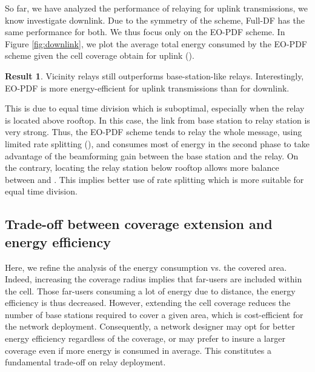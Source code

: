 \documentclass[journal]{IEEEtran}
\theoremstyle{definition}
\newtheorem{result}{Result}
\begin{document}
So far, we have analyzed the performance of relaying for uplink transmissions, we know investigate downlink. Due to the symmetry of the scheme, Full-DF has the same performance for both. We thus focus only on the EO-PDF scheme.
In Figure \ref{fig:downlink}, we plot the average total energy consumed by the EO-PDF scheme given the cell coverage obtain for uplink ().\vspace*{-5pt}\begin{result}
Vicinity relays still outperforms base-station-like relays. Interestingly, EO-PDF is more energy-efficient for uplink transmissions than for downlink.
\end{result} \vspace*{-5pt} \noindent
This is due to equal time division which is suboptimal, especially when the relay is located above rooftop. In this case, the link from base station to relay station is very strong. Thus, the EO-PDF scheme tends to relay the whole message, using limited rate splitting (), and consumes most of energy in the second phase to take advantage of the beamforming gain between the base station and the relay. On the contrary, locating the relay station below rooftop allows more balance between  and . This implies better use of rate splitting which is more suitable for equal time division.






\subsection{Trade-off between coverage extension and energy efficiency}

Here, we refine the analysis of the energy consumption vs.
the covered area.
Indeed, increasing the coverage radius implies that far-users are included within the cell. Those far-users consuming a lot of energy due to distance, the energy efficiency is thus decreased. However, extending the cell coverage reduces the number of base stations required to cover a given area, which is cost-efficient for the network deployment.
Consequently, a network designer may opt for better energy efficiency regardless of the coverage, or may prefer to insure a larger coverage even if more energy is consumed in average. 
This constitutes a fundamental trade-off on relay deployment. 
\end{document}
